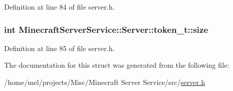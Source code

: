 Definition at line 84 of file server.\+h.

\subsubsection[{\texorpdfstring{size}{size}}]{\setlength{\rightskip}{0pt plus 5cm}int Minecraft\+Server\+Service\+::\+Server\+::token\+\_\+t\+::size}\hypertarget{struct_minecraft_server_service_1_1_server_1_1token__t_a04cc8e58e20e2846ccfa1f5d2ff9d47f}{}\label{struct_minecraft_server_service_1_1_server_1_1token__t_a04cc8e58e20e2846ccfa1f5d2ff9d47f}


Definition at line 85 of file server.\+h.



The documentation for this struct was generated from the following file\+:\begin{DoxyCompactItemize}
\item 
/home/mel/projects/\+Misc/\+Minecraft Server Service/src/\hyperlink{server_8h}{server.\+h}\end{DoxyCompactItemize}
